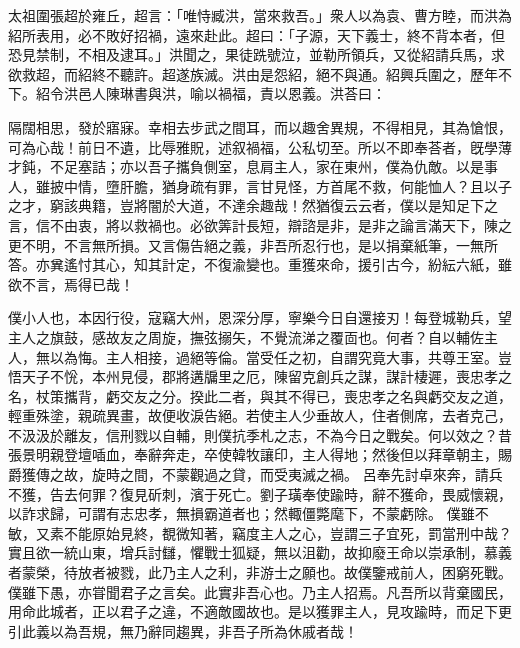 \begin{pinyinscope}
 
 
 
 太祖圍張超於雍丘，超言：「唯恃臧洪，當來救吾。」衆人以為袁、曹方睦，而洪為紹所表用，必不敗好招禍，遠來赴此。超曰：「子源，天下義士，終不背本者，但恐見禁制，不相及逮耳。」洪聞之，果徒跣號泣，並勒所領兵，又從紹請兵馬，求欲救超，而紹終不聽許。超遂族滅。洪由是怨紹，絕不與通。紹興兵圍之，歷年不下。紹令洪邑人陳琳書與洪，喻以禍福，責以恩義。洪荅曰：
 
 
 
 
 隔闊相思，發於寤寐。幸相去步武之間耳，而以趣舍異規，不得相見，其為愴恨，可為心哉！前日不遺，比辱雅貺，述叙禍福，公私切至。所以不即奉荅者，旣學薄才鈍，不足塞詰；亦以吾子攜負側室，息肩主人，家在東州，僕為仇敵。以是事人，雖披中情，墮肝膽，猶身疏有罪，言甘見怪，方首尾不救，何能恤人？且以子之才，窮該典籍，豈將闇於大道，不達余趣哉！然猶復云云者，僕以是知足下之言，信不由衷，將以救禍也。必欲筭計長短，辯諮是非，是非之論言滿天下，陳之更不明，不言無所損。又言傷告絕之義，非吾所忍行也，是以捐棄紙筆，一無所答。亦兾遙忖其心，知其計定，不復渝變也。重獲來命，援引古今，紛紜六紙，雖欲不言，焉得已哉！
 
 
僕小人也，本因行役，寇竊大州，恩深分厚，寧樂今日自還接刃！每登城勒兵，望主人之旗鼓，感故友之周旋，撫弦搦矢，不覺流涕之覆靣也。何者？自以輔佐主人，無以為悔。主人相接，過絕等倫。當受任之初，自謂究竟大事，共尊王室。豈悟天子不恱，本州見侵，郡將遘牖里之厄，陳留克創兵之謀，謀計棲遲，喪忠孝之名，杖策攜背，虧交友之分。揆此二者，與其不得已，喪忠孝之名與虧交友之道，輕重殊塗，親疏異畫，故便收淚告絕。若使主人少垂故人，住者側席，去者克己，不汲汲於離友，信刑戮以自輔，則僕抗季札之志，不為今日之戰矣。何以效之？昔張景明親登壇喢血，奉辭奔走，卒使韓牧讓印，主人得地；然後但以拜章朝主，賜爵獲傳之故，旋時之間，不蒙觀過之貸，而受夷滅之禍。
 呂奉先討卓來奔，請兵不獲，告去何罪？復見斫刺，濱于死亡。劉子璜奉使踰時，辭不獲命，畏威懷親，以詐求歸，可謂有志忠孝，無損霸道者也；然輙僵斃麾下，不蒙虧除。
 僕雖不敏，又素不能原始見終，覩微知著，竊度主人之心，豈謂三子宜死，罰當刑中哉？實且欲一統山東，增兵討讎，懼戰士狐疑，無以沮勸，故抑廢王命以崇承制，慕義者蒙榮，待放者被戮，此乃主人之利，非游士之願也。故僕鑒戒前人，困窮死戰。僕雖下愚，亦甞聞君子之言矣。此實非吾心也。乃主人招焉。凡吾所以背棄國民，用命此城者，正以君子之違，不適敵國故也。是以獲罪主人，見攻踰時，而足下更引此義以為吾規，無乃辭同趨異，非吾子所為休戚者哉！
 
 
 

\end{pinyinscope}
